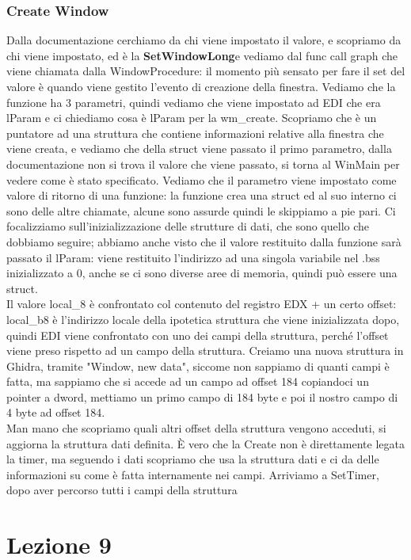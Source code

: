 \documentclass[12pt, oneside]{extbook}
\begin{document}
\subsection{Create Window}
Dalla documentazione cerchiamo da chi viene impostato il valore, e scopriamo da chi viene impostato, ed è la \textbf{SetWindowLong}e vediamo dal func call graph che viene chiamata dalla WindowProcedure: il momento più sensato per fare il set del valore è quando viene gestito l'evento di creazione della finestra. Vediamo che la funzione ha 3 parametri, quindi vediamo che viene impostato ad EDI che era lParam e ci chiediamo cosa è lParam per la wm\_create. Scopriamo che è un puntatore ad una struttura che contiene informazioni relative alla finestra che viene creata, e vediamo che della struct viene passato il primo parametro, dalla documentazione non si trova il valore che viene passato, si torna al WinMain per vedere come è stato specificato. Vediamo che il parametro viene impostato come valore di ritorno di una funzione: la funzione crea una struct ed al suo interno ci sono delle altre chiamate, alcune sono assurde quindi le skippiamo a pie pari. Ci focalizziamo sull'inizializzazione delle strutture di dati, che sono quello che dobbiamo seguire; abbiamo anche visto che il valore restituito dalla funzione sarà passato il lParam: viene restituito l'indirizzo ad una singola variabile nel .bss inizializzato a 0, anche se ci sono diverse aree di memoria, quindi può essere una struct.\\ Il valore local\_8 è confrontato col contenuto del registro EDX + un certo offset: local\_b8 è l'indirizzo locale della ipotetica struttura che viene inizializzata dopo,  quindi EDI viene confrontato con uno dei campi della struttura, perché l'offset viene preso rispetto ad un campo della struttura. Creiamo una nuova struttura in Ghidra, tramite "Window, new data", siccome non sappiamo di quanti campi è fatta, ma sappiamo che si accede ad un campo ad offset 184 copiandoci un pointer a dword, mettiamo un primo campo di 184 byte e poi il nostro campo di 4 byte ad offset 184.\\  Man mano che scopriamo quali altri offset della struttura vengono acceduti, si aggiorna la struttura dati definita. È vero che la Create non è direttamente legata la timer, ma seguendo i dati scopriamo che usa la struttura dati e ci da delle informazioni su come è fatta internamente nei campi. Arriviamo a SetTimer, dopo aver percorso tutti i campi della struttura
\chapter{Lezione 9}
\end{document}

